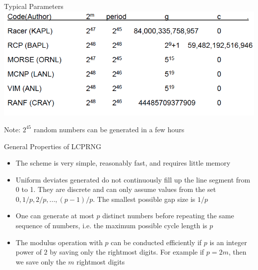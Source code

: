 \documentclass[xcolor=x11names,compress]{beamer}
\renewcommand{\(}{\begin{columns}}
\renewcommand{\)}{\end{columns}}
\newcommand{\<}[1]{\begin{column}{#1}}
\renewcommand{\>}{\end{column}}
\begin{document}
\begin{frame}{Typical Parameters}
\includegraphics[scale=0.4]{rng2}

Note: $2^{45}$ random numbers can be generated in a few hours
\end{frame}

\begin{frame}{General Properties of LCPRNG}
\begin{itemize}
\item The scheme is very simple, reasonably fast, and requires little memory
\item Uniform deviates generated do not continuously fill up the line segment from 0 to 1. They are discrete and can only assume values from the set $0, 1/p, 2/p,...,(p-1)/p$. The smallest possible gap size is $1/p$
\item One can generate at most $p$ distinct numbers before repeating the same sequence of numbers, i.e. the maximum possible cycle length is $p$
\item The modulus operation with $p$ can be conducted efficiently if $p$ is an integer power of $2$ by saving only the rightmost digits. For example if $p = 2m$, then we save only the $m$ rightmost digits
\end{itemize}  	
\end{frame}
\end{document}
